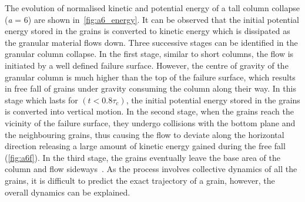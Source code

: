 The evolution of normalised kinetic and potential energy of a tall column 
collapse (\textit{a} = 6) are shown in~\cref{fig:a6_energy}. It can be 
observed that the initial potential energy stored in the 
grains is converted to kinetic energy which is dissipated as the granular 
material flows down. Three successive stages can be identified in the granular 
column collapse. In the first stage, similar to short columns, the flow is 
initiated by a well defined failure surface. However, the centre of gravity of 
the granular column is much 
higher than the top of the failure surface, which results in free fall of 
grains under gravity 
consuming the column along their way. In this stage which lasts for
$(t<0.8\tau_{c})$, the initial potential energy stored in the grains is 
converted into vertical motion. In the second stage, when the grains reach the 
vicinity of the failure surface, they undergo collisions with the bottom plane 
and the neighbouring grains, thus causing the flow to deviate along the 
horizontal direction releasing a large amount of kinetic energy gained during 
the free fall (\cref{fig:a6f}). In the third stage, the grains eventually 
leave the base area of the column and flow sideways~\citep{Lajeunesse2004}. As 
the process involves collective dynamics of all the grains, it is difficult 
to predict the exact trajectory of a grain, however, the overall dynamics can 
be explained. 


